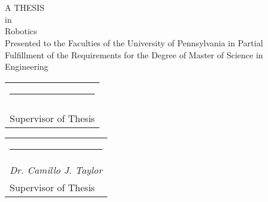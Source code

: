 \newcommand{\namesig}[3][6cm]{%

  \singlespacing 
  \begin{tabular}{@{}p{#1}@{}}
    \\[2\normalbaselineskip] \hrule \\[0pt]
    {\textit{#2}} \\[0pt]
    {#3}
  \end{tabular}
}

\begin{titlepage}
\begin{center}
\thispagestyle{empty}
{ \large \bfseries \thetitle \\[0.4cm] }
\textsc{\theauthor}\\[0.5cm]
A THESIS \\
in \\
Robotics\\

Presented to the Faculties of the University of Pennsylvania in Partial \\
Fulfillment of the Requirements for the Degree of Master of Science in Engineering
\\
\theyear

\end{center}
\namesig{\theadvisor}{Supervisor of Thesis}
\namesig{Dr. Camillo J. Taylor}{Supervisor of Thesis}

\end{titlepage}



